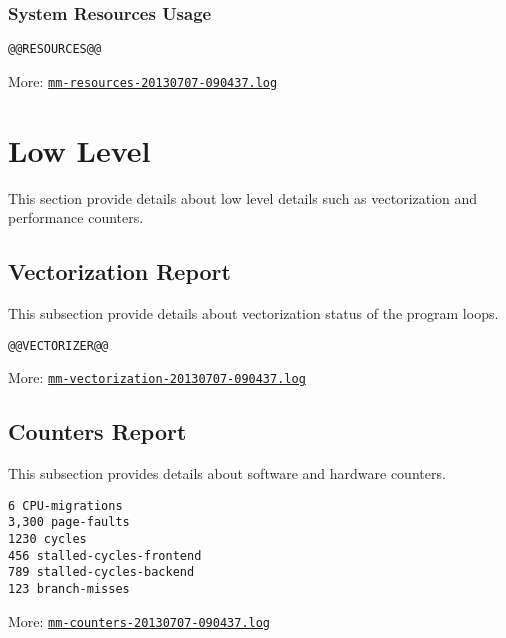 \documentclass[a4paper, twocolumn]{article}
\begin{document}
\subsubsection{System Resources Usage}

\begin{verbatim}
@@RESOURCES@@
\end{verbatim}

More: \href{TBD}{\tt mm-resources-20130707-090437.log}

\section{Low Level}

This section provide details about low level details such as vectorization and performance counters.

\subsection{Vectorization Report}

This subsection provide details about vectorization status of the program loops.

\begin{verbatim}
@@VECTORIZER@@
\end{verbatim}

More: \href{TBD}{\tt mm-vectorization-20130707-090437.log}

\subsection{Counters Report}

This subsection provides details about software and hardware counters.

\begin{verbatim}
6 CPU-migrations
3,300 page-faults
1230 cycles
456 stalled-cycles-frontend
789 stalled-cycles-backend
123 branch-misses
\end{verbatim}

More: \href{TBD}{\tt mm-counters-20130707-090437.log}
\end{document}
